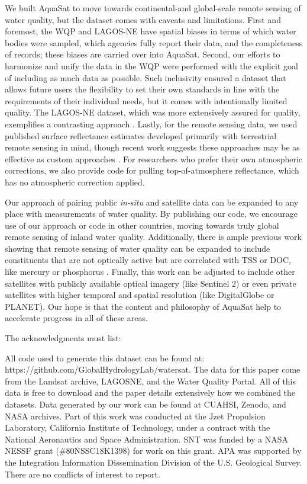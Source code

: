 \documentclass[]{agujournal2018}
\begin{document}
We built AquaSat to move towards continental-and global-scale remote
sensing of water quality, but the dataset comes with caveats and
limitations. First and foremost, the WQP and LAGOS-NE have spatial
biases in terms of which water bodies were sampled, which agencies fully
report their data, and the completeness of records; these biases are
carried over into AquaSat. Second, our efforts to harmonize and unify
the data in the WQP were performed with the explicit goal of including
as much data as possible. Such inclusivity ensured a dataset that allows
future users the flexibility to set their own standards in line with the
requirements of their individual needs, but it comes with intentionally
limited quality. The LAGOS-NE dataset, which was more extensively
assured for quality, exemplifies a contrasting approach
\citep{Soranno2017,Soranno2015}. Lastly, for the remote sensing data, we
used published surface reflectance estimates developed primarily with
terrestrial remote sensing in mind, though recent work suggests these
approaches may be as effective as custom approaches \citep{Kuhn2019}.
For researchers who prefer their own atmospheric corrections, we also
provide code for pulling top-of-atmosphere reflectance, which has no
atmospheric correction applied.

Our approach of pairing public \emph{in-situ} and satellite data can be
expanded to any place with measurements of water quality. By publishing
our code, we encourage use of our approach or code in other countries,
moving towards truly global remote sensing of inland water quality.
Additionally, there is ample previous work showing that remote sensing
of water quality can be expanded to include constituents that are not
optically active but are correlated with TSS or DOC, like mercury
\citep{Fichot2016,Telmer2006} or phosphorus \citep{Kutser1995}. Finally,
this work can be adjusted to include other satellites with publicly
available optical imagery (like Sentinel 2) or even private satellites
with higher temporal and spatial resolution (like DigitalGlobe or
PLANET). Our hope is that the content and philosophy of AquaSat help to
accelerate progress in all of these areas.

\acknowledgments

The acknowledgments must list:

All code used to generate this dataset can be found at:
https://github.com/GlobalHydrologyLab/watersat. The data for this paper
come from the Landsat archive, LAGOSNE, and the Water Quality Portal.
All of this data is free to download and the paper details extensively
how we combined the datasets. Data generated by our work can be found at
CUAHSI, Zenodo, and NASA archives. Part of this work was conducted at
the Jzet Propulsion Laboratory, California Institute of Technology,
under a contract with the National Aeronautics and Space Administration.
SNT was funded by a NASA NESSF grant (\#80NSSC18K1398) for work on this
grant. APA was supported by the Integration Information Dissemination
Division of the U.S. Geological Survey. There are no conflicts of
interest to report.


\end{document}
